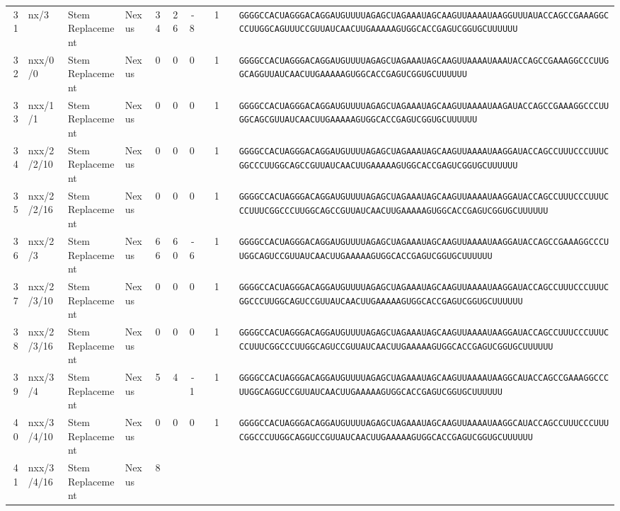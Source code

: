 \begin{tabular}{rlllrrrrrcl}
 31 &
 nx/3 &
 Stem Replacement &
 Nexus &
 34 &
 26 &
 -8 &
  &
 1 &
  &
 \verb|GGGGCCACUAGGGACAGGAUGUUUUAGAGCUAGAAAUAGCAAGUUAAAAUAAGGUUUAUACCAGCCGAAAGGCCCUUGGCAGUUUCCGUUAUCAACUUGAAAAAGUGGCACCGAGUCGGUGCUUUUUU| \\
 32 &
 nxx/0/0 &
 Stem Replacement &
 Nexus &
 0 &
 0 &
 0 &
  &
 1 &
  &
 \verb|GGGGCCACUAGGGACAGGAUGUUUUAGAGCUAGAAAUAGCAAGUUAAAAUAAAUACCAGCCGAAAGGCCCUUGGCAGGUUAUCAACUUGAAAAAGUGGCACCGAGUCGGUGCUUUUUU| \\
 33 &
 nxx/1/1 &
 Stem Replacement &
 Nexus &
 0 &
 0 &
 0 &
  &
 1 &
  &
 \verb|GGGGCCACUAGGGACAGGAUGUUUUAGAGCUAGAAAUAGCAAGUUAAAAUAAGAUACCAGCCGAAAGGCCCUUGGCAGCGUUAUCAACUUGAAAAAGUGGCACCGAGUCGGUGCUUUUUU| \\
 34 &
 nxx/2/2/10 &
 Stem Replacement &
 Nexus &
 0 &
 0 &
 0 &
  &
 1 &
  &
 \verb|GGGGCCACUAGGGACAGGAUGUUUUAGAGCUAGAAAUAGCAAGUUAAAAUAAGGAUACCAGCCUUUCCCUUUCGGCCCUUGGCAGCCGUUAUCAACUUGAAAAAGUGGCACCGAGUCGGUGCUUUUUU| \\
 35 &
 nxx/2/2/16 &
 Stem Replacement &
 Nexus &
 0 &
 0 &
 0 &
  &
 1 &
  &
 \verb|GGGGCCACUAGGGACAGGAUGUUUUAGAGCUAGAAAUAGCAAGUUAAAAUAAGGAUACCAGCCUUUCCCUUUCCCUUUCGGCCCUUGGCAGCCGUUAUCAACUUGAAAAAGUGGCACCGAGUCGGUGCUUUUUU| \\
 36 &
 nxx/2/3 &
 Stem Replacement &
 Nexus &
 66 &
 60 &
 -6 &
  &
 1 &
  &
 \verb|GGGGCCACUAGGGACAGGAUGUUUUAGAGCUAGAAAUAGCAAGUUAAAAUAAGGAUACCAGCCGAAAGGCCCUUGGCAGUCCGUUAUCAACUUGAAAAAGUGGCACCGAGUCGGUGCUUUUUU| \\
 37 &
 nxx/2/3/10 &
 Stem Replacement &
 Nexus &
 0 &
 0 &
 0 &
  &
 1 &
  &
 \verb|GGGGCCACUAGGGACAGGAUGUUUUAGAGCUAGAAAUAGCAAGUUAAAAUAAGGAUACCAGCCUUUCCCUUUCGGCCCUUGGCAGUCCGUUAUCAACUUGAAAAAGUGGCACCGAGUCGGUGCUUUUUU| \\
 38 &
 nxx/2/3/16 &
 Stem Replacement &
 Nexus &
 0 &
 0 &
 0 &
  &
 1 &
  &
 \verb|GGGGCCACUAGGGACAGGAUGUUUUAGAGCUAGAAAUAGCAAGUUAAAAUAAGGAUACCAGCCUUUCCCUUUCCCUUUCGGCCCUUGGCAGUCCGUUAUCAACUUGAAAAAGUGGCACCGAGUCGGUGCUUUUUU| \\
 39 &
 nxx/3/4 &
 Stem Replacement &
 Nexus &
 5 &
 4 &
 -1 &
  &
 1 &
  &
 \verb|GGGGCCACUAGGGACAGGAUGUUUUAGAGCUAGAAAUAGCAAGUUAAAAUAAGGCAUACCAGCCGAAAGGCCCUUGGCAGGUCCGUUAUCAACUUGAAAAAGUGGCACCGAGUCGGUGCUUUUUU| \\
 40 &
 nxx/3/4/10 &
 Stem Replacement &
 Nexus &
 0 &
 0 &
 0 &
  &
 1 &
  &
 \verb|GGGGCCACUAGGGACAGGAUGUUUUAGAGCUAGAAAUAGCAAGUUAAAAUAAGGCAUACCAGCCUUUCCCUUUCGGCCCUUGGCAGGUCCGUUAUCAACUUGAAAAAGUGGCACCGAGUCGGUGCUUUUUU| \\
 41 &
 nxx/3/4/16 &
 Stem Replacement &
 Nexus &
 8 &

\end{tabular}
